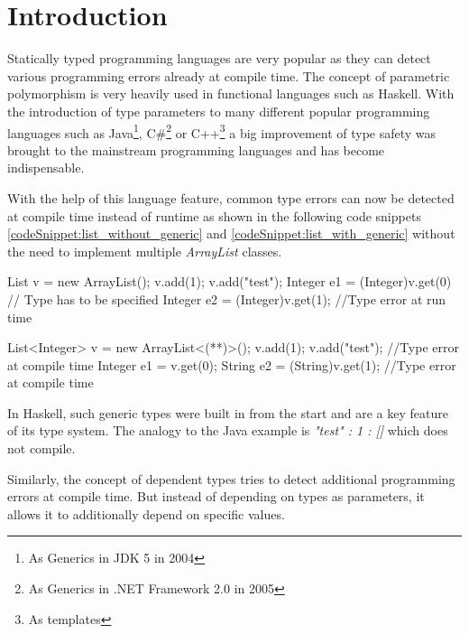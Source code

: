 \section{Introduction}\label{section:introduction}
Statically typed programming languages are very popular as they can detect various programming errors already at compile time.
The concept of parametric polymorphism is very heavily used in functional languages such as Haskell. With the introduction of type parameters to many different popular programming languages such as Java\footnote{As Generics in JDK 5 in 2004\cite{JDK5}},
 C\#\footnote{As Generics in .NET Framework 2.0 in 2005\cite{dotnet20}} or C++\footnote{As templates} a big improvement of type safety was brought to the mainstream programming languages and has become indispensable.

With the help of this language feature, common type errors can now be detected at compile time instead of runtime as shown in the following code snippets \ref{codeSnippet:list_without_generic} and \ref{codeSnippet:list_with_generic} without the need to implement multiple \emph{ArrayList} classes.

\begin{adjustbox}{width=\columnwidth}
\begin{codesnippet}[caption={List without generic argument in Java}, label={codeSnippet:list_without_generic}]
List v = new ArrayList();
v.add(1);
v.add("test");
Integer e1 = (Integer)v.get(0) // Type has to be specified
Integer e2 = (Integer)v.get(1); //Type error at run time
\end{codesnippet}
\end{adjustbox}
\begin{adjustbox}{width=\columnwidth}
\begin{codesnippet}[escapeinside={(*}{*)}, caption={List with type argument in Java}, label={codeSnippet:list_with_generic}]
List<Integer> v = new ArrayList<(**)>();
v.add(1);
v.add("test"); //Type error at compile time
Integer e1 = v.get(0);
String e2 = (String)v.get(1); //Type error at compile time
\end{codesnippet}
\end{adjustbox}
\linebreak

In Haskell, such generic types were built in from the start and are a key feature of its type system. The analogy to the Java example is \emph{"test" : 1 : []} which does not compile.

Similarly, the concept of dependent types tries to detect additional programming errors at compile time.
But instead of depending on types as parameters, it allows it to additionally depend on specific values. 

